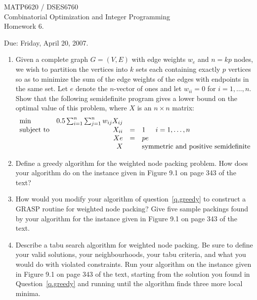 \documentclass[11pt]{article}
\begin{document}
\begin{center}
  \begin{large}
     MATP6620 / DSES6760 \\
Combinatorial Optimization and Integer Programming \\
       Homework 6.
  \end{large}
\end{center}

\begin{flushright}
   Due:  Friday, April 20, 2007.
\end{flushright}



\begin{enumerate}

\item
Given a complete graph $G=(V,E)$ with edge weights $w_e$ and $n=kp$ nodes,
we wish to partition the vertices into
$k$ sets each containing exactly $p$ vertices so as to minimize the sum of the edge weights of the edges with endpoints in the same set.
Let $e$ denote the $n$-vector of ones and let $w_{ii}=0$ for $i=1,\ldots,n$.
Show that the following semidefinite program gives a lower bound
on the optimal value of this problem, where $X$ is an $n \times n$ matrix:
\begin{displaymath}
\begin{array}{lrcll}
\min & 0.5  \sum_{i=1}^n \sum_{j=1}^n w_{ij} X_{ij}  \\
\mbox{subject to} & X_{ii} & = & 1 & i = 1,\ldots,n \\
& Xe & = & pe \\
& X && \multicolumn{2}{l}{\mbox{symmetric and positive semidefinite}}
\end{array}
\end{displaymath}

\item  \label{q.greedy}
Define a greedy algorithm for the weighted node packing problem.
How does your algorithm do on the instance given in Figure 9.1 on page 343 of the text?

\item
How would you modify your algorithm of question~\ref{q.greedy}
to construct a GRASP routine for weighted node packing?
Give five sample packings found by your algorithm for the
instance given in Figure 9.1 on page 343 of the text.

\item
Describe a tabu search algorithm for weighted node packing.
Be sure to define your valid solutions, your neighbourhoods,
your tabu criteria,
and what you would do with violated constraints.
Run your algorithm on the instance given in Figure 9.1 on page 343 of the text,
starting from the solution you found in Question~\ref{q.greedy}
and running until the algorithm finds three more local minima.



\end{enumerate}
\end{document}
